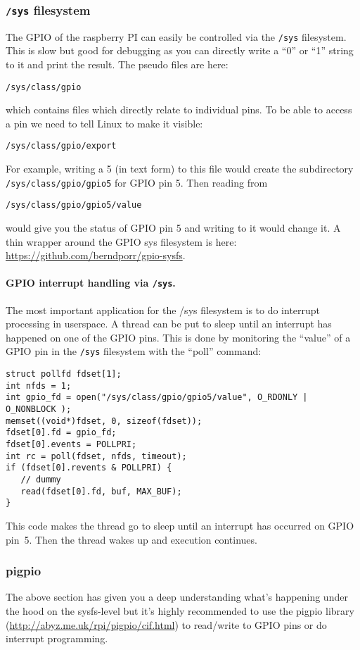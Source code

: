 \documentclass[12pt]{report}
\begin{document}
\subsubsection{\texttt{/sys} filesystem}
The GPIO of the raspberry PI can easily be controlled via
the \texttt{/sys} filesystem. This is slow but good for
debugging as you can directly write a
``0'' or ``1'' string to it and print the result. The
pseudo files are here:
\begin{verbatim}
/sys/class/gpio
\end{verbatim}
which contains files which directly relate to individual pins.
To be able to access a pin we need to tell Linux to make
it visible:
\begin{verbatim}
/sys/class/gpio/export
\end{verbatim}
For example, writing a 5 (in text form) to this file would
create the subdirectory \texttt{/sys/class/gpio/gpio5} for GPIO pin 5.
Then reading from
\begin{verbatim}
/sys/class/gpio/gpio5/value
\end{verbatim}
would give you the status of GPIO pin 5 and writing
to it would change it.
A thin wrapper around the GPIO sys filesystem is here: \url{https://github.com/berndporr/gpio-sysfs}.

\paragraph{GPIO interrupt handling via \texttt{/sys}\label{gpioIRQ}.}
The most important application for the /sys filesystem is to
do interrupt processing in userspace.
A thread can be put to sleep until an interrupt has happened on one of
the GPIO pins. This is done by monitoring the ``value''
of a GPIO pin in the \texttt{/sys} filesystem with the ``poll'' command:
\begin{verbatim}
struct pollfd fdset[1];
int nfds = 1;
int gpio_fd = open("/sys/class/gpio/gpio5/value", O_RDONLY | O_NONBLOCK );
memset((void*)fdset, 0, sizeof(fdset));
fdset[0].fd = gpio_fd;
fdset[0].events = POLLPRI;
int rc = poll(fdset, nfds, timeout);
if (fdset[0].revents & POLLPRI) {
   // dummy
   read(fdset[0].fd, buf, MAX_BUF);
}
\end{verbatim}
This code makes the thread go to sleep until an interrupt has occurred on
GPIO pin~5. Then the thread wakes up and execution continues.

\subsubsection{pigpio}
The above section has given you a deep understanding what's happening
under the hood on the sysfs-level but it's highly recommended to
use the pigpio library (\url{http://abyz.me.uk/rpi/pigpio/cif.html})
to read/write to GPIO pins or do interrupt programming.
\end{document}
